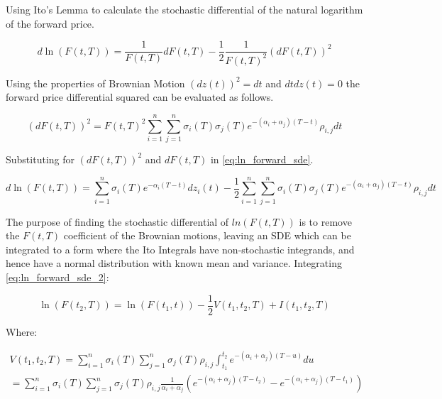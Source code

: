 \documentclass{article}
\begin{document}
\bigskip

Using Ito's Lemma to calculate the stochastic differential of the natural logarithm
of the forward price.

\begin{equation}
    \label{eq:ln_forward_sde}
    d\ln(F(t, T)) = \frac{1}{F(t, T)} dF(t, T) - \frac{1}{2}
        \frac{1}{F(t, T)^2} (dF(t, T))^2
\end{equation}

Using the properties of Brownian Motion $(dz(t))^2=dt$ and $dtdz(t)=0$ the forward
price differential squared can be evaluated as follows.

\begin{equation}
    \label{eq:df_squared}
    (dF(t, T))^2 = F(t, T)^2 \sum_{i=1}^n \sum_{j=1}^n \sigma_i(T) \sigma_j(T)
    e^{-(\alpha_i + \alpha_j)(T-t)}\rho_{i,j}dt
\end{equation}

Substituting for $(dF(t, T))^2$ and $dF(t, T)$ in \ref{eq:ln_forward_sde}.

\begin{equation}
    \label{eq:ln_forward_sde_2}
    d\ln(F(t, T)) = \sum_{i=1}^n \sigma_i(T)e^{-\alpha_i(T-t)}dz_i(t) - 
    \frac{1}{2} \sum_{i=1}^n \sum_{j=1}^n \sigma_i(T) \sigma_j(T)
    e^{-(\alpha_i + \alpha_j)(T-t)}\rho_{i,j}dt
\end{equation}

The purpose of finding the stochastic differential of $ln(F(t, T))$ is to remove the
$F(t, T)$ coefficient of the Brownian motions, leaving an SDE which can be integrated
to a form where the Ito Integrals have non-stochastic integrands, and hence have a normal
distribution with known mean and variance. Integrating \ref{eq:ln_forward_sde_2}:

\begin{equation}
    \ln(F(t_2, T)) = \ln(F(t_1, t)) - \frac{1}{2} V(t_1, t_2, T) + I(t_1, t_2, T)
\end{equation}

Where:

\begin{eqnarray}
    \label{eq:forward_drift_adjust}
    \nonumber
    V(t_1, t_2, T) =  \sum_{i=1}^n \sigma_i(T) \sum_{j=1}^n 
    \sigma_j(T) \rho_{i,j} \int_{t_1}^{t_2} e^{-(\alpha_i + \alpha_j)(T-u)} du\\
    = \sum_{i=1}^n \sigma_i(T) \sum_{j=1}^n \sigma_j(T) \rho_{i,j} 
    \frac{1}{\alpha_i + \alpha_j} (e^{-(\alpha_i + \alpha_j)(T-t_2)} - 
    e^{-(\alpha_i + \alpha_j)(T-t_1)}) \\
    \nonumber
\end{eqnarray}
\end{document}
